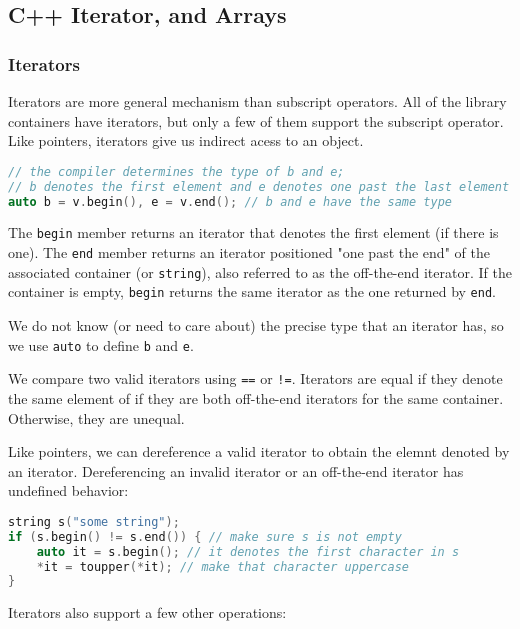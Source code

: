 \subsection{C++ Iterator, and Arrays}
\label{task:20231203_cpp}

\subsubsection{Iterators}

Iterators are more general mechanism than subscript operators. All of the library containers have iterators, but only a few of them support the subscript operator. Like pointers, iterators give us indirect acess to an object. 
\begin{lstlisting}[language=C++]
// the compiler determines the type of b and e;
// b denotes the first element and e denotes one past the last element in v 
auto b = v.begin(), e = v.end(); // b and e have the same type
\end{lstlisting}
The \texttt{begin} member returns an iterator that denotes the first element (if there is one). The \texttt{end} member returns an iterator positioned "one past the end" of the associated container (or \texttt{string}), also referred to as the off-the-end iterator. If the container is empty, \texttt{begin} returns the same iterator as the one returned by \texttt{end}. 

We do not know (or need to care about) the precise type that an iterator has, so we use \texttt{auto} to define \texttt{b} and \texttt{e}.

We compare two valid iterators using \texttt{==} or \texttt{!=}. Iterators are equal if they denote the same element of if they are both off-the-end iterators for the same container. Otherwise, they are unequal. 

Like pointers, we can dereference a valid iterator to obtain the elemnt denoted by an iterator. Dereferencing an invalid iterator or an off-the-end iterator has undefined behavior:
\begin{lstlisting}[language=C++]
string s("some string"); 
if (s.begin() != s.end()) { // make sure s is not empty 
    auto it = s.begin(); // it denotes the first character in s 
    *it = toupper(*it); // make that character uppercase 
}
\end{lstlisting}

Iterators also support a few other operations:

